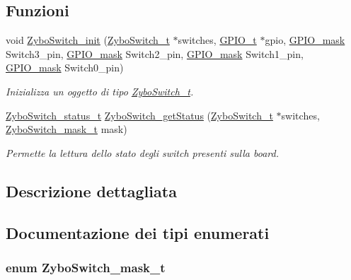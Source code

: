 \subsection*{Funzioni}
\begin{DoxyCompactItemize}
\item 
void \hyperlink{group___zybo_switch_ga121018c0ccfeb05b6e8f692a5a6955d7}{Zybo\+Switch\+\_\+init} (\hyperlink{struct_zybo_switch__t}{Zybo\+Switch\+\_\+t} $\ast$switches, \hyperlink{struct_g_p_i_o__t}{G\+P\+I\+O\+\_\+t} $\ast$gpio, \hyperlink{group___g_p_i_o_ga6d5aef8a8a54ee2f602d47252ff66595}{G\+P\+I\+O\+\_\+mask} Switch3\+\_\+pin, \hyperlink{group___g_p_i_o_ga6d5aef8a8a54ee2f602d47252ff66595}{G\+P\+I\+O\+\_\+mask} Switch2\+\_\+pin, \hyperlink{group___g_p_i_o_ga6d5aef8a8a54ee2f602d47252ff66595}{G\+P\+I\+O\+\_\+mask} Switch1\+\_\+pin, \hyperlink{group___g_p_i_o_ga6d5aef8a8a54ee2f602d47252ff66595}{G\+P\+I\+O\+\_\+mask} Switch0\+\_\+pin)
\begin{DoxyCompactList}\small\item\em Inizializza un oggetto di tipo \hyperlink{struct_zybo_switch__t}{Zybo\+Switch\+\_\+t}. \end{DoxyCompactList}\item 
\hyperlink{group___zybo_switch_ga4ba6b49b2f47ebb464aefcea7e23e04a}{Zybo\+Switch\+\_\+status\+\_\+t} \hyperlink{group___zybo_switch_gafac8daf9a9a585f8f20ef2a6fa883a1f}{Zybo\+Switch\+\_\+get\+Status} (\hyperlink{struct_zybo_switch__t}{Zybo\+Switch\+\_\+t} $\ast$switches, \hyperlink{group___zybo_switch_ga2e0602a824354f25c395f938caba3703}{Zybo\+Switch\+\_\+mask\+\_\+t} mask)
\begin{DoxyCompactList}\small\item\em Permette la lettura dello stato degli switch presenti sulla board. \end{DoxyCompactList}\end{DoxyCompactItemize}


\subsection{Descrizione dettagliata}


\subsection{Documentazione dei tipi enumerati}
\hypertarget{group___zybo_switch_ga2e0602a824354f25c395f938caba3703}{
\subsubsection[{Zybo\+Switch\+\_\+mask\+\_\+t}]{\setlength{\rightskip}{0pt plus 5cm}enum {\bf Zybo\+Switch\+\_\+mask\+\_\+t}}}\label{group___zybo_switch_ga2e0602a824354f25c395f938caba3703}



